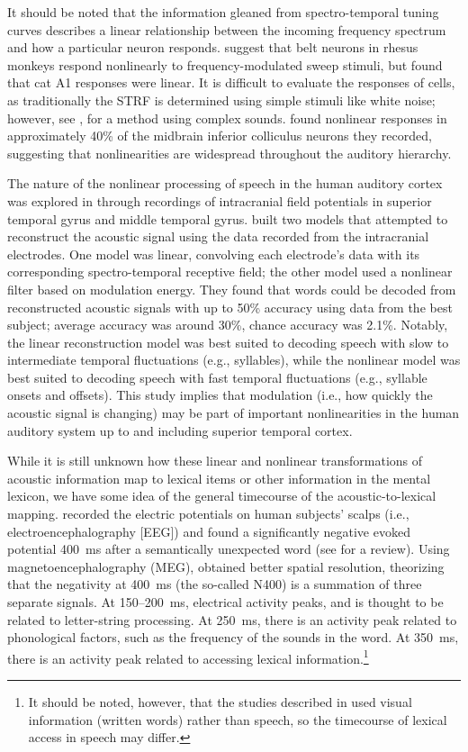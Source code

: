 It should be noted
that the information gleaned from
spectro-temporal tuning curves
describes a linear relationship
between the incoming frequency spectrum
and how a particular neuron responds.
\citet{tian2004}
suggest that belt neurons
in rhesus monkeys respond nonlinearly
to frequency-modulated sweep stimuli,
but \citet{kowalski1995}
found that cat A1 responses were linear.
It is difficult to evaluate
the responses of cells,
as traditionally the STRF
is determined using simple stimuli
like white noise;
however, see \citet{theunissen2000},
for a method using complex sounds.
\citet{escabi2002}
found nonlinear responses
in approximately 40\%
of the midbrain inferior colliculus
neurons they recorded,
suggesting that nonlinearities
are widespread
throughout the auditory hierarchy.

The nature of the nonlinear processing
of speech in the human auditory cortex
was explored in \citet{pasley2012}
through recordings of
intracranial field potentials
in superior temporal gyrus
and middle temporal gyrus.
\citeauthor{pasley2012} built
two models that attempted to
reconstruct the acoustic signal
using the data recorded from
the intracranial electrodes.
One model was linear,
convolving each electrode's data
with its corresponding
spectro-temporal receptive field;
the other model used
a nonlinear filter
based on modulation energy.
They found that
words could be decoded from
reconstructed acoustic signals
with up to 50\% accuracy
using data from the best subject;
average accuracy was around 30\%,
chance accuracy was 2.1\%.
Notably, the linear reconstruction model
was best suited to decoding speech
with slow to intermediate temporal fluctuations
(e.g., syllables),
while the nonlinear model was best suited
to decoding speech with fast temporal fluctuations
(e.g., syllable onsets and offsets).
This study implies that modulation
(i.e., how quickly the acoustic signal is changing)
may be part of important nonlinearities
in the human auditory system
up to and including superior temporal cortex.

While it is still unknown how
these linear and nonlinear
transformations of acoustic information
map to lexical items
or other information in the mental lexicon,
we have some idea of the general
timecourse of the
acoustic-to-lexical mapping.
\citet{kutas1980}
recorded the electric potentials
on human subjects' scalps
(i.e., electroencephalography [EEG])
and found a significantly
negative evoked potential
400~ms after a semantically unexpected word
(see \citealt{kutas2000} for a review).
Using magnetoencephalography (MEG),
\citet{pylkkanen2003}
obtained better spatial resolution,
theorizing that the negativity
at 400~ms (the so-called N400)
is a summation of three separate signals.
At 150--200~ms, electrical activity peaks,
and is thought to be related to
letter-string processing.
At 250~ms, there is an activity peak
related to phonological factors,
such as the frequency of the sounds in the word.
At 350~ms, there is an activity peak
related to accessing
lexical information.\footnote{
  It should be noted, however,
  that the studies described in
  \citet{pylkkanen2003} used visual information
  (written words) rather than speech,
  so the timecourse of lexical access
  in speech may differ.}

